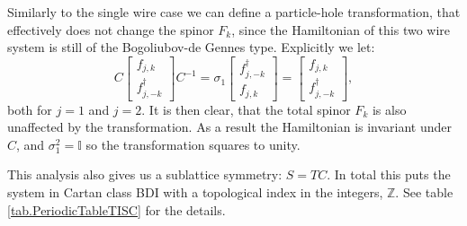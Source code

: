 Similarly to the single wire case we can define a particle-hole transformation, that effectively does not change the spinor $F_k$, since the Hamiltonian of this two wire system is still of the Bogoliubov-de Gennes type. Explicitly we let:
\begin{equation}
C\begin{bmatrix} f_{j,k} \\ f^\dagger_{j,-k} \end{bmatrix}C^{-1} = \sigma_1 \begin{bmatrix} f^\dagger_{j,-k} \\ f_{j,k} \end{bmatrix} = \begin{bmatrix} f_{j,k} \\ f^\dagger_{j,-k} \end{bmatrix}, 
\end{equation} 
both for $j=1$ and $j=2$. It is then clear, that the total spinor $F_k$ is also unaffected by the transformation. As a result the Hamiltonian is invariant under $C$, and $\sigma_1^2 = \mathbb{I}$ so the transformation squares to unity. 

This analysis also gives us a sublattice symmetry: $S = TC$. In total this puts the system in Cartan class BDI with a topological index in the integers, $\mathbb{Z}$. See table \ref{tab.PeriodicTableTISC} for the details. 
